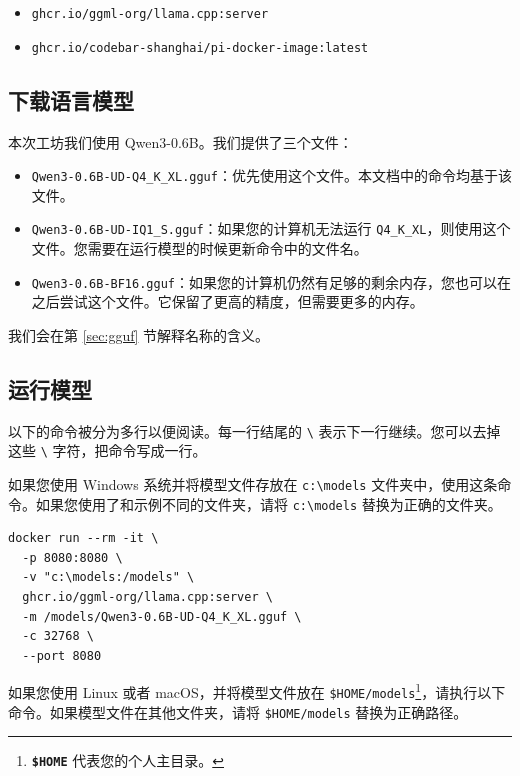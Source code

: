 \documentclass[a4paper,12pt]{article}
\begin{document}
\begin{itemize}
\item \texttt{ghcr.io/ggml-org/llama.cpp:server}
\item \texttt{ghcr.io/codebar-shanghai/pi-docker-image:latest}
\end{itemize}

\subsection{下载语言模型}

本次工坊我们使用 Qwen3-0.6B。我们提供了三个文件：

\begin{itemize}
\item \texttt{Qwen3-0.6B-UD-Q4\_K\_XL.gguf}：优先使用这个文件。本文档中的命令均基于该文件。
\item \texttt{Qwen3-0.6B-UD-IQ1\_S.gguf}：如果您的计算机无法运行 \texttt{Q4\_K\_XL}，则使用这个文件。您需要在运行模型的时候更新命令中的文件名。
\item \texttt{Qwen3-0.6B-BF16.gguf}：如果您的计算机仍然有足够的剩余内存，您也可以在之后尝试这个文件。它保留了更高的精度，但需要更多的内存。
\end{itemize}

我们会在第 \ref{sec:gguf} 节解释名称的含义。

\subsection{运行模型}
\label{sec:run-llama.cpp}

以下的命令被分为多行以便阅读。每一行结尾的 \texttt{\textbackslash} 表示下一行继续。您可以去掉这些 \texttt{\textbackslash} 字符，把命令写成一行。

如果您使用 Windows 系统并将模型文件存放在 \texttt{c:\textbackslash{}models} 文件夹中，使用这条命令。如果您使用了和示例不同的文件夹，请将 \texttt{c:\textbackslash{}models} 替换为正确的文件夹。

\begin{verbatim}
docker run --rm -it \
  -p 8080:8080 \
  -v "c:\models:/models" \
  ghcr.io/ggml-org/llama.cpp:server \
  -m /models/Qwen3-0.6B-UD-Q4_K_XL.gguf \
  -c 32768 \
  --port 8080
\end{verbatim}

如果您使用 Linux 或者 macOS，并将模型文件放在 \texttt{\$HOME/models}\footnote{\textbf{\texttt{\$HOME}} 代表您的个人主目录。}，请执行以下命令。如果模型文件在其他文件夹，请将 \texttt{\$HOME/models} 替换为正确路径。
\end{document}
